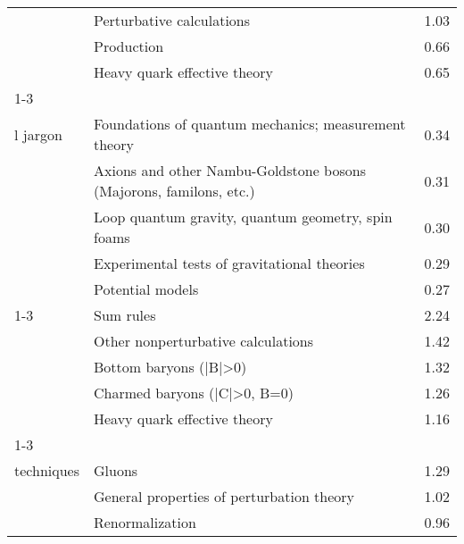 \begin{longtable}[H]{p{}|p{}|p{}}
                                                               & Perturbative calculations &  1.03 \\
                                                               & Production &  0.66 \\
                                                               & Heavy quark effective theory &  0.65 \\
\cline{1-3}
\multirow{5}{*}{\begin{tabular}{l}Phenomenologica\\ l jargon\end{tabular}} & Foundations of quantum mechanics; measurement theory &  0.34 \\
                                                               & Axions and other Nambu-Goldstone bosons (Majorons, familons, etc.) &  0.31 \\
                                                               & Loop quantum gravity, quantum geometry, spin foams &  0.30 \\
                                                               & Experimental tests of gravitational theories &  0.29 \\
                                                               & Potential models &  0.27 \\
\cline{1-3}
\multirow{5}{*}{\begin{tabular}{l}QCD\end{tabular}} & Sum rules &  2.24 \\
                                                               & Other nonperturbative calculations &  1.42 \\
                                                               & Bottom baryons (|B|>0) &  1.32 \\
                                                               & Charmed baryons (|C|>0, B=0) &  1.26 \\
                                                               & Heavy quark effective theory &  1.16 \\
\cline{1-3}
\multirow{5}{*}{\begin{tabular}{l}QCD calculation\\ techniques\end{tabular}} & Gluons &  1.29 \\
                                                               & General properties of perturbation theory &  1.02 \\
                                                               & Renormalization &  0.96 \\

\end{longtable}
